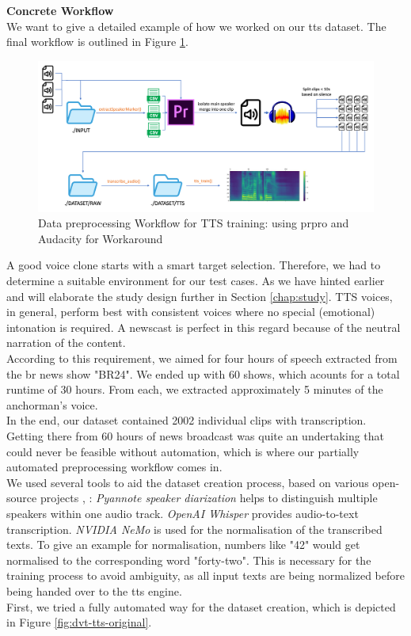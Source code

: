 \documentclass[
  a4paper,  %
  twoside,  %
  bibliography=totoc,
  headsepline,
  cleardoublepage=empty,
  parskip=half,
  draft=false
]{scrbook}
\begin{document}
\textbf{Concrete Workflow} \\
We want to give a detailed example of how we worked on our \gls{tts} dataset. The final workflow is outlined in Figure \ref{fig:dvt-tts-wf}.

\begin{figure}[h]
  \centering
  \includegraphics[width=1\textwidth]{./graphics/tts/tts prpro.png}
  \caption{Data preprocessing Workflow for TTS training: using \gls{prpro} and Audacity for Workaround}
  \label{fig:dvt-tts-wf}
\end{figure}

A good voice clone starts with a smart target selection. Therefore, we had to determine a suitable environment for our test cases. As we have hinted earlier and will elaborate the study design further in Section \ref{chap:study}. TTS voices, in general, perform best with consistent voices where no special (emotional) intonation is required. A newscast is perfect in this regard because of the neutral narration of the content. \\
According to this requirement, we aimed for four hours of speech extracted from the \gls{br} news show "BR24". We ended up with 60 shows, which acounts for a total runtime of 30 hours. From each, we extracted approximately 5 minutes of the anchorman's voice.\\
In the end, our dataset contained 2002 individual clips with transcription. Getting there from 60 hours of news broadcast was quite an undertaking that could never be feasible without automation, which is where our partially automated preprocessing workflow comes in. \\
We used several tools to aid the dataset creation process, based on various open-source projects \cite{micaAudioSplitterUsing2023}, \cite{harperEndtoEndToolkitVoice2023}: \textit{Pyannote speaker diarization} helps to distinguish multiple speakers within one audio track. \textit{OpenAI Whisper} provides audio-to-text transcription. \textit{NVIDIA NeMo} is used for the normalisation of the transcribed texts. To give an example for normalisation, numbers like "42" would get normalised to the corresponding word "forty-two". This is necessary for the training process to avoid ambiguity, as all input texts are being normalized before being handed over to the \gls{tts} engine. \\
First, we tried a fully automated way for the dataset creation, which is depicted in Figure \ref{fig:dvt-tts-original}.
\end{document}
